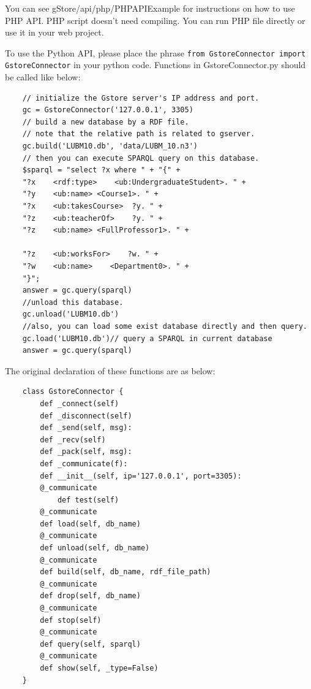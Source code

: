 \documentclass[titlepage, a4paper, 12pt]{article}
\begin{document}
	
	You can see gStore/api/php/PHPAPIExample for instructions on how to use PHP API. PHP script doesn't need compiling. You can run PHP file directly or use it in your web project.
	

	
	
	To use the Python API, please place the phrase \texttt{from GstoreConnector import GstoreConnector} in your python code. Functions in GstoreConnector.py should be called like below:
	
	\begin{verbatim}
	// initialize the Gstore server's IP address and port.
	gc = GstoreConnector('127.0.0.1', 3305)
	// build a new database by a RDF file.
	// note that the relative path is related to gserver.
	gc.build('LUBM10.db', 'data/LUBM_10.n3')
	// then you can execute SPARQL query on this database.
	$sparql = "select ?x where " + "{" +
	"?x    <rdf:type>    <ub:UndergraduateStudent>. " +
	"?y    <ub:name> <Course1>. " +
	"?x    <ub:takesCourse>  ?y. " +
	"?z    <ub:teacherOf>    ?y. " +
	"?z    <ub:name> <FullProfessor1>. " +

	"?z    <ub:worksFor>    ?w. " +
	"?w    <ub:name>    <Department0>. " +
	"}";
	answer = gc.query(sparql)
	//unload this database.
	gc.unload('LUBM10.db')
	//also, you can load some exist database directly and then query.
	gc.load('LUBM10.db')// query a SPARQL in current database
	answer = gc.query(sparql)
	\end{verbatim}
	
	The original declaration of these functions are as below:
	
	\begin{verbatim}
	class GstoreConnector {
		def _connect(self)
		def _disconnect(self)
		def _send(self, msg):
		def _recv(self)
		def _pack(self, msg):
		def _communicate(f):
		def __init__(self, ip='127.0.0.1', port=3305):
		@_communicate
    		def test(self)
		@_communicate
		def load(self, db_name)
		@_communicate
		def unload(self, db_name)
		@_communicate
		def build(self, db_name, rdf_file_path)
		@_communicate
		def drop(self, db_name)
		@_communicate
		def stop(self)
		@_communicate
		def query(self, sparql)
		@_communicate
		def show(self, _type=False)
	}
	\end{verbatim}
	
\end{document}
